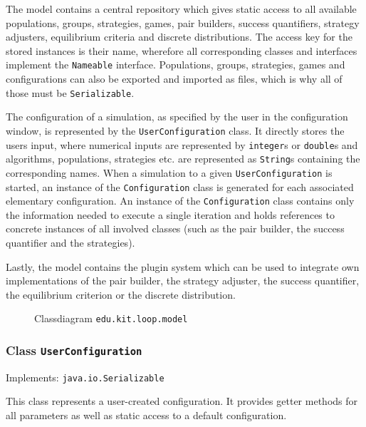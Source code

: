 \documentclass[parskip=full,11pt]{scrartcl}
\begin{document}
The model contains a central repository which gives static access to all available populations, groups, strategies, games, pair builders, success quantifiers, strategy adjusters, equilibrium criteria and discrete distributions. The access key for the stored instances is their name, wherefore all corresponding classes and interfaces implement the \texttt{Nameable} interface. Populations, groups, strategies, games and configurations can also be exported and imported as files, which is why all of those must be \texttt{Serializable}.

The configuration of a simulation, as specified by the user in the configuration window, is represented by the \texttt{UserConfiguration} class. It directly stores the users input, where numerical inputs are represented by \texttt{integer}s or \texttt{double}s and algorithms, populations, strategies etc. are represented as \texttt{String}s containing the corresponding names. When a simulation to a given \texttt{UserConfiguration} is started, an instance of the \texttt{Configuration} class is generated for each associated elementary configuration. An instance of the \texttt{Configuration} class contains only the information needed to execute a single iteration and holds references to concrete instances of all involved classes (such as the pair builder, the success quantifier and the strategies).

Lastly, the model contains the plugin system which can be used to integrate own implementations of the pair builder, the strategy adjuster, the success quantifier, the equilibrium criterion or the discrete distribution.
\iftrue
\begin{figure}[h]
	\centering
	\fontsize{5}{8}\selectfont
	

	\caption{Classdiagram \texttt{edu.kit.loop.model}}
\end{figure}
\fi
\subsubsection{Class \texttt{UserConfiguration}}
Implements: \texttt{java.io.Serializable}

This class represents a user-created configuration. It provides getter methods for all parameters as well as static access to a default configuration.
\end{document}
